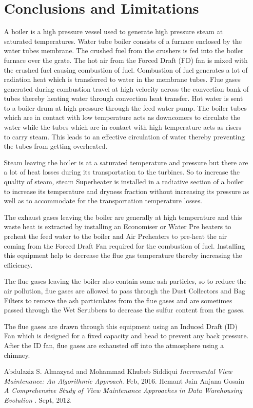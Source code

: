 \documentclass[12pt]{report}
\begin{document}
\section{Conclusions and Limitations}
A boiler is a high pressure vessel used to generate high pressure steam at saturated temperatures. Water tube boiler consists of a furnace enclosed by the water tubes membrane. The crushed fuel from the crushers is fed into the boiler furnace over the grate. The hot air from the Forced Draft (FD) fan is mixed with the crushed fuel causing combustion of fuel.
Combustion of fuel generates a lot of radiation heat which is transferred to water in the membrane tubes. Flue gases generated during combustion travel at high velocity across the convection bank of tubes thereby heating water through convection heat transfer. Hot water is sent to a boiler drum at high pressure through the feed water pump. The boiler tubes which are in contact with low temperature acts as downcomers to circulate the water while the tubes which are in contact with high temperature acts as risers to carry steam. This leads to an effective circulation of water thereby preventing the tubes from getting overheated.

Steam leaving the boiler is at a saturated temperature and pressure but there are a lot of heat losses during its transportation to the turbines. So to increase the quality of steam, steam Superheater is installed in a radiative section of a boiler to increase its temperature and dryness fraction without increasing its pressure as well as to accommodate for the transportation temperature losses.

The exhaust gases leaving the boiler are generally at high temperature and this waste heat is extracted by installing an Economiser or Water Pre heaters to preheat the feed water to the boiler and Air Preheaters to pre-heat the air coming from the Forced Draft Fan required for the combustion of fuel. Installing this equipment help to decrease the flue gas temperature thereby increasing the efficiency.

The flue gases leaving the boiler also contain some ash particles, so to reduce the air pollution, flue gases are allowed to pass through the Dust Collectors and Bag Filters to remove the ash particulates from the flue gases and are sometimes passed through the Wet Scrubbers to decrease the sulfur content from the gases.

The flue gases are drawn through this equipment using an Induced Draft (ID) Fan which is designed for a fixed capacity and head to prevent any back pressure. After the ID fan, flue gases are exhausted off into the atmosphere using a chimney.
\\ 
\begin{thebibliography}{999}
Abdulaziz S. Almazyad and Mohammad Khubeb Siddiqui\emph{ Incremental View Maintenance: An Algorithmic 
Approach}.
 	 Feb, 2016.
Hemant Jain Anjana Gosain \emph{A Comprehensive Study of View Maintenance Approaches in Data Warehousing Evolution }.
 	 Sept, 2012. 	 
\end{thebibliography}
\end{document}
